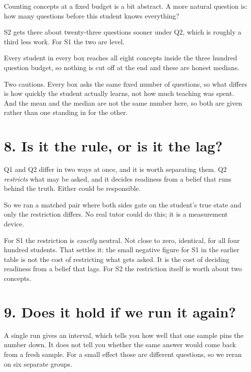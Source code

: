 \documentclass[11pt]{article}
\begin{document}
Counting concepts at a fixed budget is a bit abstract. A more natural
question is: how many questions before this student knows everything?



\noindent S2 gets there about twenty-three questions sooner under Q2,
which is roughly a third less work. For S1 the two are level.

Every student in every box reaches all eight concepts inside the three
hundred question budget, so nothing is cut off at the end and these are
honest medians.

Two cautions. Every box asks the same fixed number of questions, so what
differs is how quickly the student actually learns, not how much teaching
was spent. And the mean and the median are not the same number here, so
both are given rather than one standing in for the other.

\section*{8. Is it the rule, or is it the lag?}

Q1 and Q2 differ in two ways at once, and it is worth separating them.
Q2 \emph{restricts} what may be asked, and it decides readiness from a
belief that runs behind the truth. Either could be responsible.

So we ran a matched pair where both sides gate on the student's true state
and only the restriction differs. No real tutor could do this; it is a
measurement device.



\noindent For S1 the restriction is \emph{exactly} neutral. Not close to
zero, identical, for all four hundred students. That settles it: the small
negative figure for S1 in the earlier table is not the cost of restricting
what gets asked. It is the cost of deciding readiness from a belief that
lags. For S2 the restriction itself is worth about two concepts.

\section*{9. Does it hold if we run it again?}

A single run gives an interval, which tells you how well that one sample
pins the number down. It does not tell you whether the same answer would
come back from a fresh sample. For a small effect those are different
questions, so we reran on six separate groups.
\end{document}
